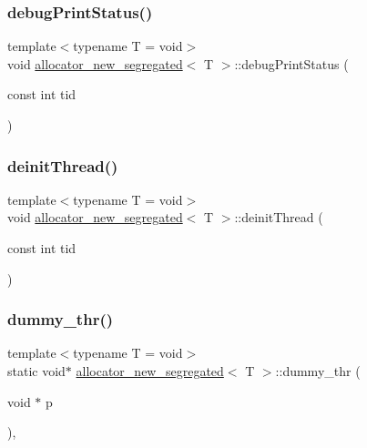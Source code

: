 \subsubsection{\texorpdfstring{debug\+Print\+Status()}{debugPrintStatus()}}
{\footnotesize\ttfamily template$<$typename T  = void$>$ \\
void \hyperlink{classallocator__new__segregated}{allocator\+\_\+new\+\_\+segregated}$<$ T $>$\+::debug\+Print\+Status (\begin{DoxyParamCaption}\item[{const int}]{tid }\end{DoxyParamCaption})\hspace{0.3cm}{\ttfamily [inline]}}

\mbox{\label{classallocator__new__segregated_ae56ef2f9fa45e5142cddbe862b342cc6}} 
\subsubsection{\texorpdfstring{deinit\+Thread()}{deinitThread()}}
{\footnotesize\ttfamily template$<$typename T  = void$>$ \\
void \hyperlink{classallocator__new__segregated}{allocator\+\_\+new\+\_\+segregated}$<$ T $>$\+::deinit\+Thread (\begin{DoxyParamCaption}\item[{const int}]{tid }\end{DoxyParamCaption})\hspace{0.3cm}{\ttfamily [inline]}}

\mbox{\label{classallocator__new__segregated_a6757b22908992b0149630326ce7f68ac}} 
\subsubsection{\texorpdfstring{dummy\+\_\+thr()}{dummy\_thr()}}
{\footnotesize\ttfamily template$<$typename T  = void$>$ \\
static void$\ast$ \hyperlink{classallocator__new__segregated}{allocator\+\_\+new\+\_\+segregated}$<$ T $>$\+::dummy\+\_\+thr (\begin{DoxyParamCaption}\item[{void $\ast$}]{p }\end{DoxyParamCaption})\hspace{0.3cm}{\ttfamily [inline]}, {\ttfamily [static]}}

